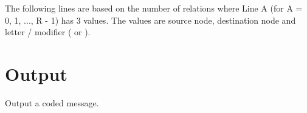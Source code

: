 \begin{flushleft}
    The following lines are based on the number of relations where Line A (for A = 0, 1, ..., R - 1) has 3 values. The values are source node, destination node and letter / modifier ( or \code{+}).
\end{flushleft}

\section*{Output}
\begin{flushleft}
    Output a coded message.
\end{flushleft}
